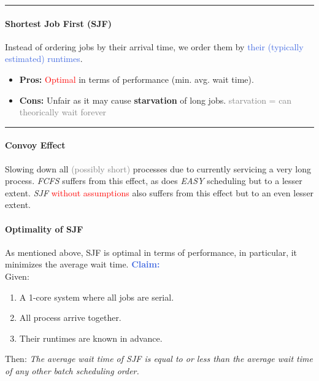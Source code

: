 \documentclass[openany,12pt]{book}
\newcommand{\red}[1]{\textcolor{Red}{#1}}
\newcommand{\blue}[1]{\textcolor{RoyalBlue}{#1}}
\newcommand{\gray}[1]{\textcolor{gray}{#1}}
\begin{document}
\noindent\rule{\linewidth}{0.4pt}


\paragraph{Shortest Job First (SJF)} Instead of ordering jobs by their arrival time, we order them by \blue{their (typically estimated) runtimes}.
\begin{itemize}
    \item \textbf{Pros:} \red{Optimal} in terms of performance (min. avg. wait time).
    \item \textbf{Cons:} Unfair as it may cause \textbf{starvation} of long jobs. \gray{starvation = can theorically wait forever}
\end{itemize}

\noindent\rule{\linewidth}{0.4pt}



\paragraph{Convoy Effect} Slowing down all \gray{(possibly short)} processes due to currently servicing a very long process. \textit{FCFS} suffers from this effect, as does \textit{EASY} scheduling but to a lesser extent. \textit{SJF} \red{without assumptions} also suffers from this effect but to an even lesser extent.

\begin{samepage}
    \paragraph{Optimality of SJF} As mentioned above, SJF is optimal in terms of performance, in particular, it minimizes the average wait time. \blue{\textbf{Claim:}}\\
    Given:
    \begin{enumerate}
        \item A 1-core system where all jobs are serial.
        \item All process arrive together.
        \item Their runtimes are known in advance.
    \end{enumerate}
    Then: \textit{The average wait time of SJF is equal to or less than the average wait time of any other batch scheduling order.}
\end{samepage}
\end{document}
